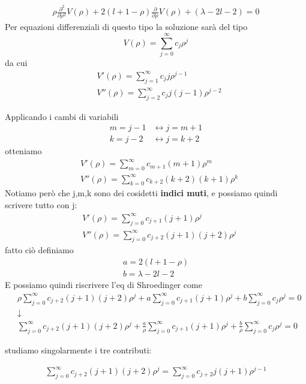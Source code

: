 \begin{align}
\rho  \frac{\partial^2}{\partial \rho^2}V(\rho) + 2(l+1-\rho)\frac{\partial }{\partial \rho}V(\rho) + (\lambda - 2l - 2)=0
\end{align}
Per equazioni differenziali di questo tipo la soluzione sarà del tipo
\begin{equation}
V(\rho)= \sum_{j=0}^\infty c_j \rho^j
\end{equation}
da cui
\begin{align}
{}&V'(\rho)= \sum_{j=1}^\infty c_j  j \rho^{j-1} \\
 &V''(\rho)= \sum_{j=2}^\infty c_j j(j-1) \rho^{j-2}
 \end{align}


Applicando i cambi di variabili
 \begin{align}
 	m=j-1 {}&\leftrightarrow j=m+1\\
 	k=j-2 &\leftrightarrow j=k+2
 \end{align} 
otteniamo
 \begin{align}
	&V'(\rho)= \sum_{m=0}^\infty c_{m+1} (m+1) \rho^{m} \\
 	&V''(\rho)= \sum_{k=0}^\infty c_{k+2} (k+2)(k+1)\rho^{k}
 \end{align}
Notiamo però che j,m,k sono dei cosidetti \textbf{indici muti}, e possiamo quindi scrivere tutto con j:
 \begin{align}
 	{}&V'(\rho)=  \sum_{j=0}^\infty c_{j+1} (j+1)\rho^j \\
 	&V''(\rho) =  \sum_{j=0}^\infty c_{j+2} (j+1)(j+2)\rho^j
 \end{align}
fatto ciò definiamo
 \begin{align}
 	a= 2(l+1-\rho) \\
 	b= \lambda - 2l - 2
 \end{align}
E possiamo quindi riscrivere l'eq di Shroedinger come
 \begin{align}
 	&\rho \sum_{j=0}^\infty c_{j+2} (j+1)(j+2)\rho^j + a\sum_{j=0}^\infty c_{j+1} (j+1)\rho^j + b\sum_{j=0}^\infty c_j \rho^j=0 \nonumber \\
 	& \downarrow  \nonumber \\
 	&\sum_{j=0}^\infty c_{j+2} (j+1)(j+2)\rho^j + \frac{a}{\rho}\sum_{j=0}^\infty c_{j+1} (j+1)\rho^j + \frac{b}{\rho}\sum_{j=0}^\infty c_j \rho^j=0
 \end{align}
 
 studiamo singolarmente i tre contributi:
 
 \begin{align}
\sum_{j=0}^\infty c_{j+2} (j+1)(j+2)\rho^j = \sum_{j=0}^\infty c_{j+2} j(j+1)\rho^{j-1} 
 \end{align}
 
